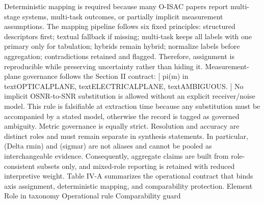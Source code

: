 {}
\markdownRendererSectionEnd \markdownRendererSectionBegin
{}\markdownRendererInterblockSeparator
{}Deterministic mapping is required because many O-ISAC papers report multi-stage systems, multi-task outcomes, or partially implicit measurement assumptions. The mapping pipeline follows six fixed principles: structured descriptors first; textual fallback if missing; multi-task keeps all labels with one primary only for tabulation; hybrids remain hybrid; normalize labels before aggregation; contradictions retained and flagged. Therefore, assignment is reproducible while preserving uncertainty rather than hiding it.\markdownRendererParagraphSeparator
{}Measurement-plane governance follows the Section II contract:\markdownRendererSoftLineBreak
{}[\markdownRendererSoftLineBreak
{}\markdownRendererBackslash{}pi(m) \markdownRendererBackslash{}in \markdownRendererLeftBrace{}\markdownRendererBackslash{}text\markdownRendererLeftBrace{}OPTICAL\markdownRendererUnderscore{}PLANE\markdownRendererRightBrace{}, \markdownRendererBackslash{}text\markdownRendererLeftBrace{}ELECTRICAL\markdownRendererUnderscore{}PLANE\markdownRendererRightBrace{}, \markdownRendererBackslash{}text\markdownRendererLeftBrace{}AMBIGUOUS\markdownRendererRightBrace{}\markdownRendererRightBrace{}.\markdownRendererSoftLineBreak
{}]\markdownRendererSoftLineBreak
{}No implicit OSNR-to-SNR substitution is allowed without an explicit receiver/noise model. This rule is falsifiable at extraction time because any substitution must be accompanied by a stated model, otherwise the record is tagged as governed ambiguity.\markdownRendererParagraphSeparator
{}Metric governance is equally strict. Resolution and accuracy are distinct roles and must remain separate in synthesis statements. In particular, (\markdownRendererBackslash{}Delta r\markdownRendererUnderscore{}\markdownRendererLeftBrace{}\markdownRendererBackslash{}min\markdownRendererRightBrace{}) and (\markdownRendererBackslash{}sigma\markdownRendererUnderscore{}r) are not aliases and cannot be pooled as interchangeable evidence. Consequently, aggregate claims are built from role-consistent subsets only, and mixed-role reporting is retained with reduced interpretive weight.\markdownRendererParagraphSeparator
{}Table IV-A summarizes the operational contract that binds axis assignment, deterministic mapping, and comparability protection.\markdownRendererParagraphSeparator
{}\markdownRendererPipe{} Element \markdownRendererPipe{} Role in taxonomy \markdownRendererPipe{} Operational rule \markdownRendererPipe{} Comparability guard \markdownRendererPipe{}\markdownRendererSoftLineBreak
